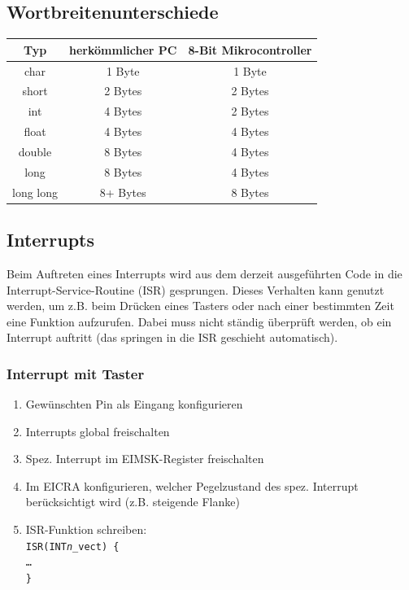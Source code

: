 \documentclass[german, threecolumn, 8pt]{latex4ei/latex4ei_sheet}
\begin{document}
\subsection{Wortbreitenunterschiede}
\begin{tabular}{c|c|c}
Typ & herkömmlicher PC & 8-Bit Mikrocontroller \\ \hline
char & 1 Byte & 1 Byte\\
short & 2 Bytes & 2 Bytes \\
int & 4 Bytes & 2 Bytes  \\
float & 4 Bytes & 4 Bytes  \\
double & 8 Bytes & 4 Bytes  \\
long & 8 Bytes & 4 Bytes \\
long long & 8+ Bytes & 8 Bytes  
\end{tabular}

\begin{minipage}{\columnwidth}
\subsection{Interrupts}
Beim Auftreten eines Interrupts wird aus dem derzeit ausgeführten Code in die Interrupt-Service-Routine (ISR) gesprungen. Dieses Verhalten kann genutzt werden, um z.B. beim Drücken eines Tasters oder nach einer bestimmten Zeit eine Funktion aufzurufen. Dabei muss nicht ständig überprüft werden, ob ein Interrupt auftritt (das springen in die ISR geschieht automatisch).
\end{minipage}
\subsubsection{Interrupt mit Taster}
\begin{enumerate}
\item Gewünschten Pin als Eingang konfigurieren
\item Interrupts global freischalten
\item Spez. Interrupt im EIMSK-Register freischalten
\item Im EICRA konfigurieren, welcher Pegelzustand des spez. Interrupt berücksichtigt wird (z.B. steigende Flanke)
\item ISR-Funktion schreiben: \\
\texttt{ISR(INT\textit{n}\_vect) \{ \\ \dots \\ \} }
\end{enumerate}
\end{document}

